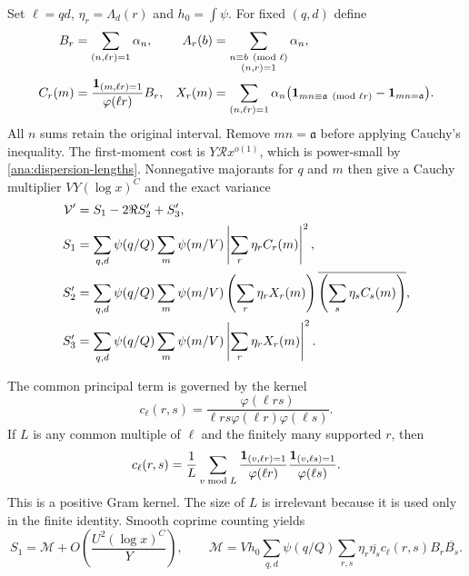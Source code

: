 Set $\ell=qd$, $\eta_r=\Lambda_d(r)$ and $h_0=\int\psi$. For fixed
$(q,d)$ define
\begin{align*}
 B_r&=\sum_{(n,\ell r)=1}\alpha_n,
 &A_r(b)&=\sum_{\substack{n\equiv b\pmod\ell\\(n,r)=1}}\alpha_n,\\
 C_r(m)&=\frac{\mathbf 1_{(m,\ell r)=1}}{\varphi(\ell r)}B_r,
 &X_r(m)&=\sum_{(n,\ell r)=1}\alpha_n
       \bigl(\mathbf 1_{mn\equiv \mathfrak{a}\pmod{\ell r}}-\mathbf 1_{mn=\mathfrak{a}}\bigr).
\end{align*}
All $n$ sums retain the original interval. Remove $mn=\mathfrak{a}$ before applying
Cauchy's inequality. The first-moment cost is
$Y\mathcal R x^{o(1)}$, which is power-small by
\eqref{ana:dispersion-lengths}. Nonnegative majorants for $q$ and $m$
then give a Cauchy multiplier $VY(\log x)^C$ and the exact variance
\begin{align}
 \mathcal V'&=S_1-2\Re S_2'+S_3',\notag\\
 S_1&=\sum_{q,d}\psi(q/Q)\sum_m\psi(m/V)
                 \left|\sum_r\eta_rC_r(m)\right|^2,\notag\\
 S_2'&=\sum_{q,d}\psi(q/Q)\sum_m\psi(m/V)
       \left(\sum_r\eta_rX_r(m)\right)
       \overline{\left(\sum_s\eta_sC_s(m)\right)},\notag\\
 S_3'&=\sum_{q,d}\psi(q/Q)\sum_m\psi(m/V)
                 \left|\sum_r\eta_rX_r(m)\right|^2.
 \label{ana:variance}
\end{align}

The common principal term is governed by the kernel
\[
 c_\ell(r,s)=\frac{\varphi(\ell rs)}{
       \ell rs\varphi(\ell r)\varphi(\ell s)}.
\]
If $L$ is any common multiple of $\ell$ and the finitely many supported
$r$, then
\begin{equation}
 c_\ell(r,s)=\frac1L\sum_{v\bmod L}
 \frac{\mathbf 1_{(v,\ell r)=1}}{\varphi(\ell r)}
 \frac{\mathbf 1_{(v,\ell s)=1}}{\varphi(\ell s)}.
 \label{ana:gram}
\end{equation}
This is a positive Gram kernel. The size of $L$ is irrelevant because it
is used only in the finite identity. Smooth coprime counting yields
\begin{equation}
 S_1=\mathcal M+O\left(\frac{U^2(\log x)^C}{Y}\right),\qquad
 \mathcal M=Vh_0\sum_{q,d}\psi(q/Q)
        \sum_{r,s}\eta_r\overline{\eta_s}
               c_\ell(r,s)B_r\overline{B_s}.
 \label{ana:mean}
\end{equation}

